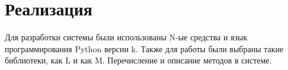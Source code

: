 \newpage
\section{Реализация}
\label{sec:Realization}

Для разработки системы были использованы N-ые средства и язык программирования Python версии k. Также для работы были выбраны такие библиотеки, как L и как M. Перечисление и описание методов в системе.